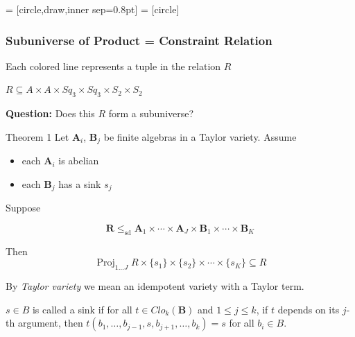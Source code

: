 \documentclass[10pt,xcolor=dvipsnames%
   ]{beamer}
\newcommand{\Proj}{\ensuremath{\operatorname{Proj}}}
\renewcommand{\.}{\cdot}
\newcommand{\bA}{\ensuremath{\mathbf{A}}}
\newcommand{\bR}{\ensuremath{\mathbf{R}}}
\begin{document}
\begin{frame}
  \newcommand{\bS}{\ensuremath{\mathbf{S}}}
  \newcommand{\bSq}{\ensuremath{\mathbf{Sq}}}

 = [circle,draw,inner sep=0.8pt]
 = [circle]
  \frametitle{Subuniverse of Product = Constraint Relation}
  \begin{center}
  \end{center}

  Each colored line represents a tuple in the relation $R$
  
  $R \subseteq A \times A \times Sq_3 \times Sq_3 \times S_2 \times S_2$

  \pause
      {\bf Question:} Does this $R$ form a subuniverse?

\end{frame}

\newcommand{\bB}{\ensuremath{\mathbf{B}}}

\begin{frame}

  \newcommand{\kk}{\ensuremath{\underline{k}}}
\newcommand{\sdp}{\ensuremath{\leq_{\mathrm{sd}}}}


\begin{exampleblock}{Theorem 1}
Let $\bA_i$, $\bB_j$ be finite algebras in a Taylor variety. Assume

\begin{itemize}
\item 
each $\bA_i$ is \alert{abelian}

\item
each $\bB_j$ has a \alert{sink} $s_j$
\end{itemize}

Suppose

  \[
  \bR \sdp \bA_1 \times \cdots \times \bA_J \times \bB_1 \times \cdots \times \bB_K
  \]

  Then
  \[
  \Proj_{1 \dots J}R \times \{s_1\} \times \{s_2\} \times \cdots \times \{s_K\}  \subseteq R
  \]
\end{exampleblock}

By \emph{Taylor variety} we mean an \alert{idempotent} variety with a Taylor term.

\pause

$s\in B$ is called a \alert{sink} if for all
$t \in Clo_k(\bB)$ and $1\leq j \leq k$, if 
$t$ depends on its $j$-th argument, then
$t(b_1, \dots, b_{j-1}, s, b_{j+1}, \dots, b_{k})=s$
for all $b_i \in B$.
\end{frame}
\end{document}
